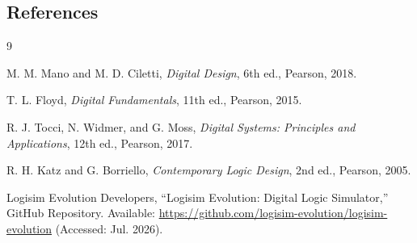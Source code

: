 \documentclass[12pt,a4paper]{article}
\begin{document}
\subsection{References}

\begin{thebibliography}{9}

M. M. Mano and M. D. Ciletti,
\textit{Digital Design},
6th ed.,
Pearson, 2018.

T. L. Floyd,
\textit{Digital Fundamentals},
11th ed.,
Pearson, 2015.

R. J. Tocci, N. Widmer, and G. Moss,
\textit{Digital Systems: Principles and Applications},
12th ed.,
Pearson, 2017.

R. H. Katz and G. Borriello,
\textit{Contemporary Logic Design},
2nd ed.,
Pearson, 2005.

Logisim Evolution Developers,
``Logisim Evolution: Digital Logic Simulator,''
GitHub Repository.
Available: \url{https://github.com/logisim-evolution/logisim-evolution}
(Accessed: Jul. 2026).

\end{thebibliography}
\end{document}
